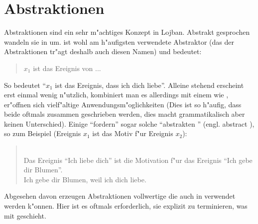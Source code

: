 \section{Abstraktionen}
Abstraktionen sind ein sehr m"achtiges Konzept in Lojban. Abstrakt gesprochen wandeln sie  in  um.  ist wohl am h"aufigsten
verwendete Abstraktor (das  der Abstraktionen tr"agt deshalb auch diesen Namen) und bedeutet:
\begin{quote}
$x_1$ ist das Ereignis von ...
\end{quote}

So bedeutet  ``$x_1$ ist das Ereignis, dass ich dich liebe''. Alleine stehend erscheint  erst einmal wenig n"utzlich,
kombiniert man es allerdings mit einem  wie , er"offnen sich vielf"altige Anwendungsm"oglichkeiten (Dies ist so h"aufig, dass beide  oftmals zusammen geschrieben werden, dies macht grammatikalisch aber keinen Unterschied). Einige  ``fordern'' sogar solche ``abstrakten '' (engl. abstract ), so zum Beispiel  (Ereignis $x_1$ ist das Motiv
f"ur Ereignis $x_2$):
\begin{quote}
 \\
Das Ereignis ``Ich liebe dich'' ist die Motivation f"ur das Ereignis ``Ich gebe dir Blumen''. \\
Ich gebe dir Blumen, weil ich dich liebe.
\end{quote}
Abgesehen davon erzeugen Abstraktionen vollwertige  die auch in  verwendet werden k"onnen. Hier ist es oftmals erforderlich, sie explizit zu terminieren, was mit  geschieht.

